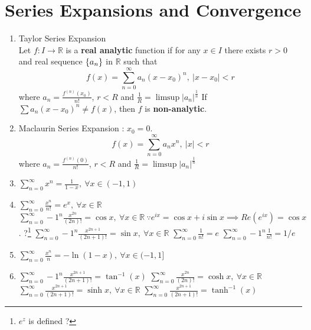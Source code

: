 \section{Series Expansions and Convergence}
\begin{enumerate}
	\item Taylor Series Expansion\\
		Let $f : I \to \mathbb{R}$ is a \textbf{real analytic} function if for any $x \in I$ there exists $r>0$ and real sequence $\{a_n\}$ in $\mathbb{R}$ such that $$ f(x) = \sum_{n = 0}^\infty a_n (x-x_0)^n,\ |x-x_0|<r $$ where $a_n = \frac{f^{(n)}(x_0)}{n!}$, $r < R$ and $\frac{1}{R} = \limsup |a_n|^\frac{1}{n}$
		\subitem If $\sum a_n(x-x_0)^n \ne f(x)$, then $f$ is \textbf{non-analytic}.
	\item Maclaurin Series Expansion : $x_0 = 0$.
		$$ f(x) = \sum_{n = 0}^\infty a_n x^n,\ |x|<r $$ where $a_n = \frac{f^{(n)}(0)}{n!}$, $r < R$ and $\frac{1}{R} = \limsup |a_n|^\frac{1}{n}$
	\item $\sum_{n = 0}^\infty x^n = \frac{1}{1-x},\ \forall x \in (-1,1)$
	\item $\sum_{n = 0}^\infty  \frac{x^n}{n!} = e^x,\ \forall x \in \mathbb{R}$
		\subitem $\sum_{n = 0}^\infty -1^n \frac{x^{2n}}{(2n)!} = \cos x,\ \forall x \in \mathbb{R}\ \because e^{ix} = \cos x + i \sin x \implies Re(e^{ix}) = \cos x$. ?\footnote{$e^z$ is defined ?}
		\subitem $\sum_{n = 0}^\infty -1^n \frac{x^{2n+1}}{(2n+1)!} = \sin x,\ \forall x \in \mathbb{R}$
		\subitem $\sum_{n=0}^\infty \frac{1}{n!} = e$
		\subitem $\sum_{n=0}^\infty -1^n\frac{1}{n!} = 1/e$
	\item $\sum_{n=0}^\infty \frac{x^n}{n} = -\ln(1-x),\ \forall x \in (-1,1]$
	\item $\sum_{n=0}^\infty -1^n\frac{x^{2n+1}}{(2n+1)!} = \tan^{-1}(x)$
		\subitem $\sum_{n = 0}^\infty \frac{x^{2n}}{(2n)!} = \cosh x,\ \forall x \in \mathbb{R}$
		\subitem $\sum_{n = 0}^\infty \frac{x^{2n+1}}{(2n+1)!} = \sinh x,\ \forall x \in \mathbb{R}$
		\subitem $\sum_{n=0}^\infty \frac{x^{2n+1}}{(2n+1)!} = \tanh^{-1}(x)$
\end{enumerate}
